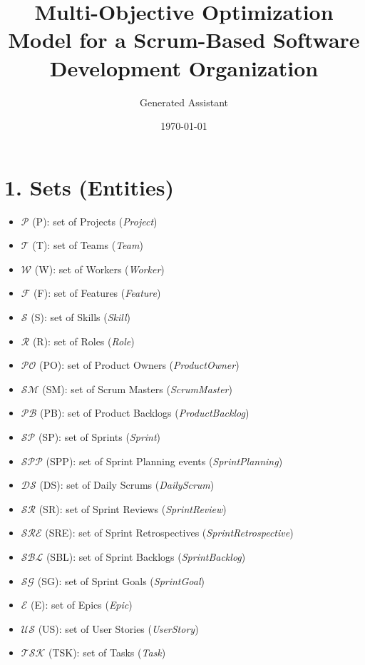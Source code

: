 \documentclass[11pt,a4paper]{article}
\title{Multi-Objective Optimization Model for a Scrum-Based Software Development Organization}
\author{Generated Assistant}
\date{\today}
\begin{document}
\maketitle
\tableofcontents
\newpage

\section{1. Sets (Entities)}
\begin{itemize}[leftmargin=2em]
  \item $\mathcal{P}$ (P): set of Projects (\textit{Project})
  \item $\mathcal{T}$ (T): set of Teams (\textit{Team})
  \item $\mathcal{W}$ (W): set of Workers (\textit{Worker})
  \item $\mathcal{F}$ (F): set of Features (\textit{Feature})
  \item $\mathcal{S}$ (S): set of Skills (\textit{Skill})
  \item $\mathcal{R}$ (R): set of Roles (\textit{Role})
  \item $\mathcal{PO}$ (PO): set of Product Owners (\textit{ProductOwner})
  \item $\mathcal{SM}$ (SM): set of Scrum Masters (\textit{ScrumMaster})
  \item $\mathcal{PB}$ (PB): set of Product Backlogs (\textit{ProductBacklog})
  \item $\mathcal{SP}$ (SP): set of Sprints (\textit{Sprint})
  \item $\mathcal{SPP}$ (SPP): set of Sprint Planning events (\textit{SprintPlanning})
  \item $\mathcal{DS}$ (DS): set of Daily Scrums (\textit{DailyScrum})
  \item $\mathcal{SR}$ (SR): set of Sprint Reviews (\textit{SprintReview})
  \item $\mathcal{SRE}$ (SRE): set of Sprint Retrospectives (\textit{SprintRetrospective})
  \item $\mathcal{SBL}$ (SBL): set of Sprint Backlogs (\textit{SprintBacklog})
  \item $\mathcal{SG}$ (SG): set of Sprint Goals (\textit{SprintGoal})
  \item $\mathcal{E}$ (E): set of Epics (\textit{Epic})
  \item $\mathcal{US}$ (US): set of User Stories (\textit{UserStory})
  \item $\mathcal{TSK}$ (TSK): set of Tasks (\textit{Task})

\end{itemize}
\end{document}
